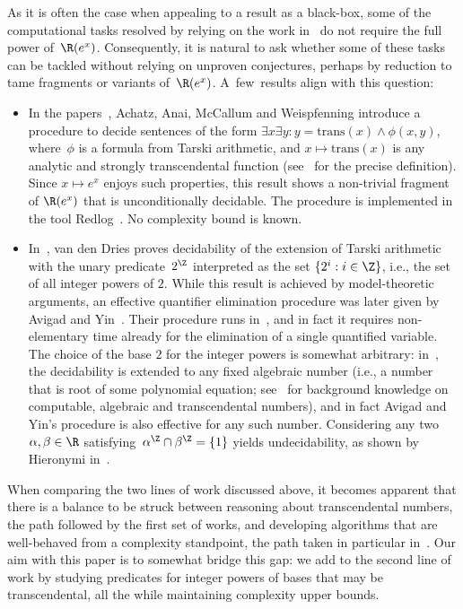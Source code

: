 As it is often the case when appealing to a result as a black-box, some of the
computational tasks resolved by relying on the work in~\cite{MacWilkie96} do not
require the full power of~$\R(e^x)$. Consequently, it is natural to ask whether
some of these tasks can be tackled without relying on unproven conjectures,
perhaps by reduction to tame fragments or variants of~$\R(e^x)$. A~few~results
align with this question:
\begin{itemize}
  \item In the papers~\cite{AnaiW00,AchatzMW08,McCallumW12}, Achatz,
    Anai, McCallum and Weispfenning introduce a procedure to decide sentences of
    the form $\exists x \exists y : y = \text{trans}(x) \land \phi(x,y)$, where~$\phi$ 
    is a formula from Tarski arithmetic, and $x \mapsto \text{trans}(x)$
    is any analytic and strongly transcendental function
    (see~\cite[Section~2]{McCallumW12} for the precise definition). 
    Since $x \mapsto e^x$ enjoys such
    properties, this result shows a non-trivial fragment of $\R(e^x)$ that is
    unconditionally decidable. The procedure is implemented in the tool
    Redlog~\cite{DolzmannS97}. No complexity bound is known.

  \item In~\cite{Dries1986}, van den Dries proves decidability of the extension
    of Tarski arithmetic with the unary predicate~$\ipow{2}$ interpreted as the
    set $\{2^i : i \in \Z\}$, i.e., the set of all integer powers of $2$. While
    this result is achieved by model-theoretic arguments, an effective
    quantifier elimination procedure was later given by Avigad and
    Yin~\cite{AvigadY07}. Their procedure runs in~\tower, and in fact it
    requires non-elementary time already for the elimination of a single
    quantified variable. The choice of the base $2$ for the integer powers is
    somewhat arbitrary: in~\cite{DriesG06}, the decidability is extended to 
    any fixed algebraic number (i.e., a number that is root of some polynomial equation;
    see~ for background knowledge on computable, algebraic and transcendental numbers), and in fact
    Avigad and Yin's procedure is also effective for any such number. 
    Considering any two $\alpha,\beta \in \R$
    satisfying~$\ipow{\alpha} \cap \ipow{\beta} = \{1\}$ yields undecidability,
    as shown by Hieronymi in~\cite{Hieronymi10}.
\end{itemize}

When comparing the two lines of work discussed above, it becomes apparent that
there is a balance to be struck between reasoning about transcendental numbers,
the path followed by the first set of works, and developing algorithms that are
well-behaved from a complexity standpoint, the path taken in particular in~\cite{AvigadY07}. Our aim with this paper is to somewhat bridge this gap: we add
to the second line of work by studying predicates for integer powers of
bases that may be transcendental, all the while maintaining complexity upper bounds. 

